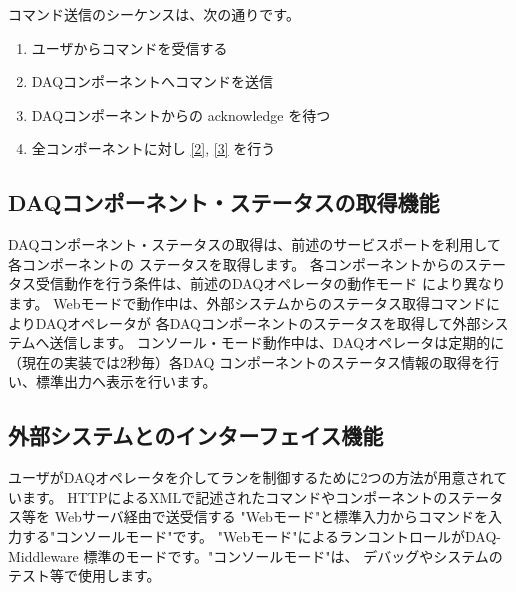 \documentclass[a4j,10pt,dvips,onecolumn,oneside,final]{jarticle}%
\newcommand {\daqmwcurrent} {
	{\bf DAQ-Middleware 1.1.0}
}
\begin{document}
コマンド送信のシーケンスは、次の通りです。
\begin{enumerate}
\item ユーザからコマンドを受信する
\item DAQコンポーネントへコマンドを送信\label{2}
\item DAQコンポーネントからの acknowledge を待つ\label{3}
\item 全コンポーネントに対し \ref{2}, \ref{3} を行う
\end{enumerate}

\subsection{DAQコンポーネント・ステータスの取得機能}\label{operator-stat}
DAQコンポーネント・ステータスの取得は、前述のサービスポートを利用して各コンポーネントの
ステータスを取得します。
各コンポーネントからのステータス受信動作を行う条件は、前述のDAQオペレータの動作モード
により異なります。
Webモードで動作中は、外部システムからのステータス取得コマンドによりDAQオペレータが
各DAQコンポーネントのステータスを取得して外部システムへ送信します。
コンソール・モード動作中は、DAQオペレータは定期的に（現在の実装では2秒毎）各DAQ
コンポーネントのステータス情報の取得を行い、標準出力へ表示を行います。



\subsection{外部システムとのインターフェイス機能}\label{web-mode}
ユーザがDAQオペレータを介してランを制御するために2つの方法が用意されています。
HTTPによるXMLで記述されたコマンドやコンポーネントのステータス等を Webサーバ経由で送受信する 
"Webモード"と標準入力からコマンドを入力する"コンソールモード"です。
"Webモード"によるランコントロールがDAQ-Middleware 標準のモードです。"コンソールモード"は、
デバッグやシステムのテスト等で使用します。
\end{document}
